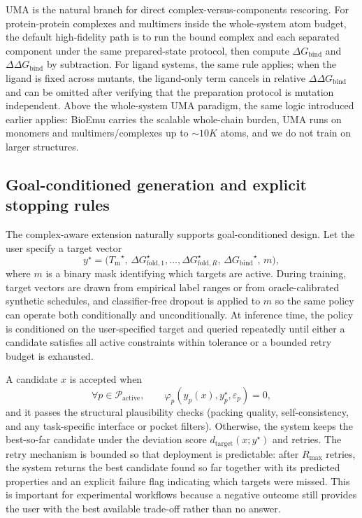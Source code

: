 \documentclass[11pt]{article}
\newcommand{\Tm}{\ensuremath{T_{\mathrm m}}}
\newcommand{\DGbind}{\ensuremath{\Delta G_{\mathrm{bind}}}}
\newcommand{\DDGbind}{\ensuremath{\Delta\Delta G_{\mathrm{bind}}}}
\begin{document}
UMA is the natural branch for direct complex-versus-components rescoring. For protein-protein complexes and multimers inside the whole-system atom budget, the default high-fidelity path is to run the bound complex and each separated component under the same prepared-state protocol, then compute $\DGbind$ and $\DDGbind$ by subtraction. For ligand systems, the same rule applies; when the ligand is fixed across mutants, the ligand-only term cancels in relative $\DDGbind$ and can be omitted after verifying that the preparation protocol is mutation independent. Above the whole-system UMA paradigm, the same logic introduced earlier applies: BioEmu carries the scalable whole-chain burden, UMA runs on monomers and multimers/complexes up to $\sim 10K$ atoms, and we do not train on larger structures. 

\subsection{Goal-conditioned generation and explicit stopping rules}

The complex-aware extension naturally supports goal-conditioned design. Let the user specify a target vector
\begin{equation}
    y^\star = \big(\Tm^\star,\,\Delta G_{\mathrm{fold},1}^\star,\ldots,\Delta G_{\mathrm{fold},R}^\star,\,\DGbind^\star,\,m\big),
\end{equation}
where $m$ is a binary mask identifying which targets are active. During training, target vectors are drawn from empirical label ranges or from oracle-calibrated synthetic schedules, and classifier-free dropout is applied to $m$ so the same policy can operate both conditionally and unconditionally. At inference time, the policy is conditioned on the user-specified target and queried repeatedly until either a candidate satisfies all active constraints within tolerance or a bounded retry budget is exhausted.

A candidate $x$ is accepted when
\begin{equation}
\label{eq:targethit_v11}
    \forall p\in \mathcal{P}_{\mathrm{active}},\qquad \varphi_p\!\left(\hat y_p(x),y_p^\star,\varepsilon_p\right)=0,
\end{equation}
and it passes the structural plausibility checks (packing quality, self-consistency, and any task-specific interface or pocket filters). Otherwise, the system keeps the best-so-far candidate under the deviation score $d_{\mathrm{target}}(x;y^\star)$ and retries. The retry mechanism is bounded so that deployment is predictable: after $R_{\max}$ retries, the system returns the best candidate found so far together with its predicted properties and an explicit failure flag indicating which targets were missed. This is important for experimental workflows because a negative outcome still provides the user with the best available trade-off rather than no answer.
\end{document}
